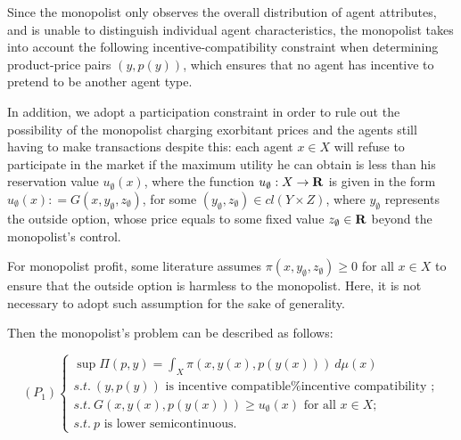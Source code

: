 
Since the monopolist only observes the overall distribution of agent attributes, and is unable to distinguish individual agent characteristics, the monopolist takes into account the following incentive-compatibility constraint when determining product-price pairs $(y, p(y))$, which ensures that no agent has incentive to pretend to be another agent type.\medskip 


In addition, we adopt a participation constraint in order to rule out the possibility of the monopolist charging exorbitant prices and the agents still having to make transactions despite this: each agent $x\in X$ will refuse to participate in the market if the maximum utility he can obtain %
is less than his reservation value $u_{\emptyset}(x)$, where the function $u_{\emptyset}: X \rightarrow {\mathbf R}$ is given in the form $u_{\emptyset}(x): = G(x, y_{\emptyset}, z_{\emptyset})$, for some $(y_{\emptyset}, z_{\emptyset}) \in cl(Y \times Z)$, where $y_{\emptyset}$ represents the outside option, whose price equals to some fixed value $z_{\emptyset} \in {\mathbf R}$ beyond the monopolist's control.  \medskip

{For monopolist profit, some literature assumes $\pi(x, y_{\emptyset}, z_{\emptyset}) \ge  0$ for all $x\in X$ to ensure that the outside option is harmless to the monopolist. Here, it is not necessary to adopt such assumption for the sake of generality. \medskip}


Then the monopolist's problem can be described as follows:


\begin{equation}\label{origin_problem}
(P_1)
\begin{cases}
\sup \Pi(p,y)=\int_{X} \pi(x, y(x), p(y(x)))~ d\mu(x)\\
s.t.\ (y,p(y)) \text{~is incentive compatible%
	};\\
s.t.\  G(x, y(x), p(y(x))) \ge u_{\emptyset}(x) \text{ for all } x \in X;\\
s.t.\ p \text{  is lower semicontinuous}.
\end{cases}
\end{equation}


